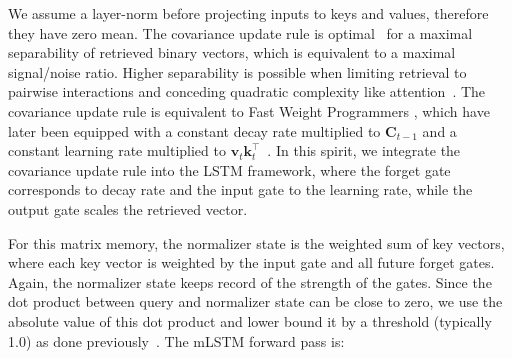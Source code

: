 We assume a layer-norm before projecting inputs to keys and values, therefore they have zero mean. The covariance update rule is optimal~\citep{Dayan:91} for a maximal separability of retrieved binary vectors, which is equivalent to a maximal signal/noise ratio. Higher separability is possible when limiting retrieval to pairwise interactions and conceding quadratic complexity like attention~\citep{Krotov:16,Krotov:17,Ramsauer:21}. The covariance update rule is equivalent to Fast Weight Programmers \citep{Schmidhuber:92ncfastweights,Schlag:21}, which have later been equipped with a constant decay rate multiplied to $\mathbf{C}_{t-1}$ and a constant learning rate multiplied to 
$\mathbf{v}_{t} \mathbf{k}_t ^\top$~\citep{Ba:16}.
In this spirit, we integrate the covariance update rule into the LSTM framework, where the forget gate corresponds to decay rate and the input gate to the learning rate, while the output gate scales the retrieved vector.

For this matrix memory, the normalizer state is the weighted sum of key vectors, where each key vector is weighted by the input gate and all future forget gates. Again, the normalizer state keeps record of the strength of the gates. Since the dot product between query and normalizer state can be close to zero, we use the absolute value of this dot product and lower bound it by a threshold (typically 1.0) as done previously~\citep{Sun:23arxiv}. The mLSTM forward pass is:

